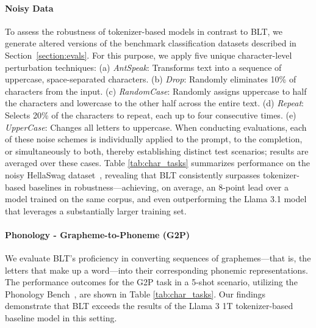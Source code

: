 \paragraph{Noisy Data} To assess the robustness of tokenizer-based models in contrast to {\textsc BLT}, we generate altered versions of the benchmark classification datasets described in Section~\ref{section:evals}. For this purpose, we apply five unique character-level perturbation techniques: (a) \textit{AntSpeak}: Transforms text into a sequence of uppercase, space-separated characters. (b) \textit{Drop}: Randomly eliminates 10\% of characters from the input. (c) \textit{RandomCase}: Randomly assigns uppercase to half the characters and lowercase to the other half across the entire text. (d) \textit{Repeat}: Selects 20\% of the characters to repeat, each up to four consecutive times. (e) \textit{UpperCase}: Changes all letters to uppercase. When conducting evaluations, each of these noise schemes is individually applied to the prompt, to the completion, or simultaneously to both, thereby establishing distinct test scenarios; results are averaged over these cases. Table \ref{tab:char_tasks} summarizes performance on the noisy HellaSwag dataset~\citep{Eval_hellaswag}, revealing that {\textsc BLT} consistently surpasses tokenizer-based baselines in robustness—achieving, on average, an 8-point lead over a model trained on the same corpus, and even outperforming the Llama 3.1 model that leverages a substantially larger training set.

\paragraph{Phonology - Grapheme-to-Phoneme (G2P)} We evaluate {\textsc BLT}'s proficiency in converting sequences of graphemes—that is, the letters that make up a word—into their corresponding phonemic representations. The performance outcomes for the G2P task in a 5-shot scenario, utilizing the Phonology Bench~\citep{suvarna2024phonologybench}, are shown in Table \ref{tab:char_tasks}. Our findings demonstrate that {\textsc BLT} exceeds the results of the Llama 3 1T tokenizer-based baseline model in this setting.


